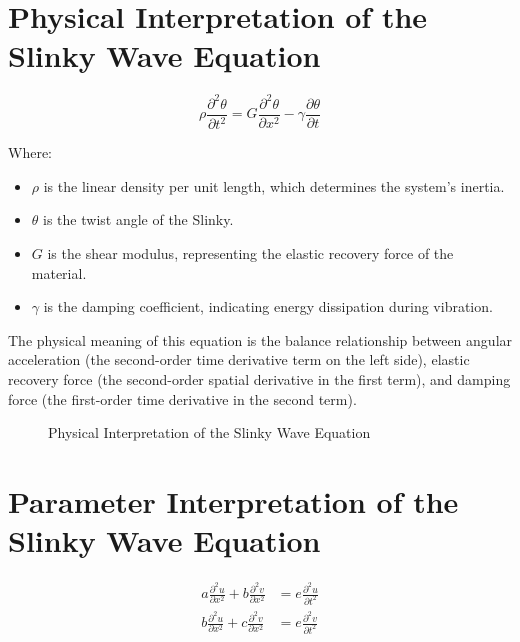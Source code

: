 \documentclass{mcmthesis}  %
\begin{document}
\begin{appendices}  %

\section{Physical Interpretation of the Slinky Wave Equation}  %

\begin{equation}
\rho\frac{\partial^2 \theta}{\partial t^2} = G\frac{\partial^2 \theta}{\partial x^2} - \gamma \frac{\partial \theta}{\partial t}
\end{equation}

Where:
\begin{itemize}
    \item $\rho$ is the linear density per unit length, which determines the system's inertia.
    \item $\theta$ is the twist angle of the Slinky.
    \item $G$ is the shear modulus, representing the elastic recovery force of the material.
    \item $\gamma$ is the damping coefficient, indicating energy dissipation during vibration.
\end{itemize}

The physical meaning of this equation is the balance relationship between angular acceleration (the second-order time derivative term on the left side), elastic recovery force (the second-order spatial derivative in the first term), and damping force (the first-order time derivative in the second term).

\begin{figure}[h!]
    \centering
    \caption{Physical Interpretation of the Slinky Wave Equation}
    \label{fig:wave_equation_interpretation}
\end{figure}

\section{Parameter Interpretation of the Slinky Wave Equation}  %

\begin{align}
a\frac{\partial^2 u}{\partial x^2} + b\frac{\partial^2 v}{\partial x^2} &= e\frac{\partial^2 u}{\partial t^2} \\
b\frac{\partial^2 u}{\partial x^2} + c\frac{\partial^2 v}{\partial x^2} &= e\frac{\partial^2 v}{\partial t^2}
\end{align}


\end{appendices}
\end{document}
